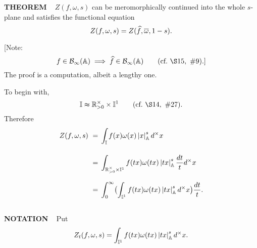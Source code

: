 \begin{x}{\small\bf THEOREM} \ %
$Z(f,\omega,s)$ can be meromorphically continued into the whole $s$-plane and satisfies the functional equation
\[
Z(f,\omega,s) = Z(\widehat{f},\overline{\omega},1-s).
\]

[Note:
\[
f \in \mathcal{B}_\infty(\A) \implies \widehat{f} \in \mathcal{B}_\infty(\A)	\qquad (\text{cf.} \  \S15, \  \#9).]
\]
The proof is a computation, albeit a lengthy one.

To begin with,
\[
\I \thickapprox \R_{>0}^\times \times \I^1	\qquad (\text{cf.} \   \S14, \  \#27).
\]
Therefore
\begin{align*}
Z (f,\omega,s) \ 	
&=\vsx \int_\I f(x)\omega(x)\abs{x}_\A^s d^\times x\\	
&=\vsx \int_{\R_{>0}^\times \times \I^1} f(tx)\omega(tx)\abs{tx}_\A^s \frac{dt}{t} d^\times x\\	
&=\vsx \int_0^\infty \bigl(\int_{\I^1} f(tx)\omega(tx)\abs{tx}_\A^s  d^\times x\bigr) \frac{dt}{t}.	
\end{align*}
\end{x}

\vspace{0.1cm}

\begin{x}{\small\bf NOTATION} \ %
Put
\[
Z_t(f,\omega,s) = \int_{\mathbb{I}^1} f(tx)\omega(tx)\left\vert tx\right\vert_{\mathbb{A}}^s  d^\times x.
\]
\end{x}

\vspace{0.1cm}

